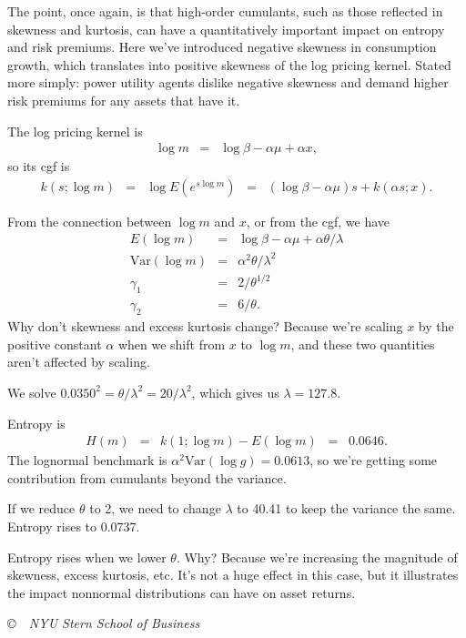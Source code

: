 \documentclass[11pt]{exam}
\begin{document}
\begin{questions}
\begin{solution}
The point, once again,
is that high-order cumulants, such as those reflected in skewness and kurtosis,
can have a quantitatively important impact on entropy and risk premiums.
Here we've introduced negative skewness in consumption growth,
which translates into positive skewness of the log pricing kernel.
Stated more simply:  power utility agents dislike negative skewness and demand
higher risk premiums for any assets that have it.
\begin{parts}
\item The log pricing kernel is
\begin{eqnarray*}
    \log m &=& \log \beta - \alpha \mu + \alpha x ,
\end{eqnarray*}
so its cgf is
\begin{eqnarray*}
    k(s; \log m) &=& \log E (e^{s \log m}) \;\;=\;\; (\log \beta - \alpha \mu)s + k(\alpha s; x).
\end{eqnarray*}
\item From the connection between $\log m$ and $x$,
or from the cgf, we have
\begin{eqnarray*}
    E (\log m) &=& \log \beta - \alpha \mu + \alpha \theta /\lambda \\
    \mbox{Var}(\log m) &=& \alpha^2 \theta /\lambda^2 \\
    \gamma_1 &=& 2/\theta^{1/2} \\
    \gamma_2 &=& 6/\theta .
\end{eqnarray*}
Why don't skewness and excess kurtosis change?
Because we're scaling $x$ by the positive constant $\alpha$ when we shift from $x$
to $\log m$, and these two quantities aren't affected by scaling.

\item We solve $ 0.0350^2 = \theta/\lambda^2 = 20/\lambda^2$,
which gives us $\lambda = 127.8$.

\item Entropy is
\begin{eqnarray*}
    H(m) &=& k(1; \log m) - E (\log m)
            \;\;=\;\; 0.0646.
\end{eqnarray*}
The lognormal benchmark is $ \alpha^2 \mbox{Var}(\log g) = 0.0613$,
so we're getting some contribution from cumulants beyond the variance.

\item If we reduce $\theta$ to 2, we need to change $\lambda$ to 40.41
 to keep the variance the same.
 Entropy rises to 0.0737.

\item Entropy rises when we lower $\theta$.
Why?  Because we're increasing the magnitude of skewness, excess kurtosis, etc.
It's not a huge effect in this case, but it illustrates the impact
nonnormal distributions can have on asset returns.

\end{parts}
\end{solution}


\end{questions}

\vfill \centerline{\it \copyright \ \number\year \ NYU Stern School of Business}
\end{document}
